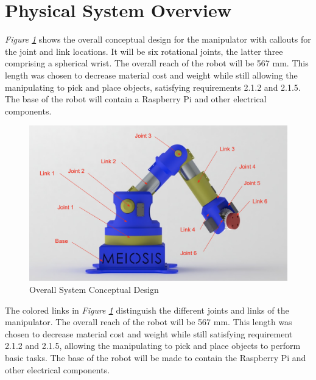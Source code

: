 \documentclass[12pt]{report}
\begin{document}
\section{Physical System Overview}
\vspace{-.75\baselineskip}
\emph{Figure \ref{fig:overall}} shows the overall conceptual design for the manipulator with callouts for the joint and link locations. It will be six rotational joints, the latter three comprising a spherical wrist. The overall reach of the robot will be 567 mm. This length was chosen to decrease material cost and weight while still allowing the manipulating to pick and place objects, satisfying requirements 2.1.2 and 2.1.5. The base of the robot will contain a Raspberry Pi and other electrical components.

\begin{figure}[htp]
  \centering
  \includegraphics[frame, width=.75\textwidth]{overall_render}
  \caption{Overall System Conceptual Design }
  \label{fig:overall}
\end{figure}

The colored links in \emph{Figure \ref{fig:overall}} distinguish the different joints and links of the manipulator. The overall reach of the robot will be 567 mm. This length was chosen to decrease material cost and weight while still satisfying requirement 2.1.2 and 2.1.5, allowing the manipulating to pick and place objects to perform basic tasks. The base of the robot will be made to contain the Raspberry Pi and other electrical components.
\newpage
\end{document}
